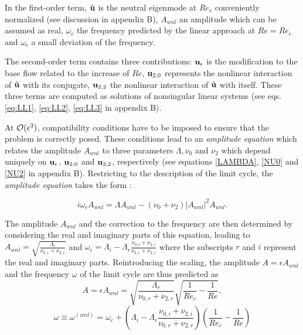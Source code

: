 \documentclass[twocolumn,10pt]{asme2ej}
\newcommand{\be}[1]{ \begin{equation} \label{#1}}
\newcommand{\ee}{\end{equation}}
\begin{document}
In the first-order term, $\hat{\bf u}$ is the neutral eigenmode at $Re_c$ conveniently normalized (see discussion in appendix B), 
$A_{wnl}$ an amplitude which can be assumed as real, $\omega_c$ the frequency predicted by the linear approach at $Re=Re_c$ and $\omega_\epsilon$ a small deviation of the frequency. 

The second-order term contains three contributions: ${\bf u}_{\epsilon}$ is the modification to the base flow related to the 
increase of $Re$, ${\bf u}_{2,0}$  represents the nonlinear interaction of $\hat{\bf u}$ with its conjugate, ${\bf u}_{2,2}$ the nonlinear 
interaction of $\hat{\bf u}$ with itself. These three terms are computed as solutions of nonsingular linear systems 
(see eqs. \ref{eq:LL1}, \ref{eq:LL2}, \ref{eq:LL3} in appendix B).

At ${\cal O}( \epsilon ^3)$, compatibility conditions have to be imposed to ensure that the problem is correctly posed. These conditions lead to an {\em amplitude equation} which relates the amplitude $ A_{wnl}$ to three parameters $\Lambda, \nu_{0}$ and $\nu_{2}$ which depend
uniquely on ${\bf u}_\epsilon$, ${\bf u}_{2,0}$ and ${\bf u}_{2,2}$, respectively (see equations \ref{LAMBDA}, \ref{NU0} and \ref{NU2} in appendix B). Restricting to the description of the limit cycle, the {\em amplitude equation} takes the form :

\be{WNL3}
i \omega_\epsilon A_{wnl} = \Lambda A_{wnl} - (\nu_0+\nu_2)  |A_{wnl}|^2 A_{wnl}.
\ee


The amplitude $A_{wnl}$ and the correction to the frequency are then determined by considering the real and imaginary parts of this equation, leading to
$
A_{wnl}= \sqrt{ \frac{\Lambda_r}{\nu_{0,r}+\nu_{2,r}}}
$ and
$
\omega_\epsilon = \Lambda_i- \Lambda_r \frac{\nu_{0,i}+\nu_{2,i}}{\nu_{0,r}+\nu_{2,r}} 
$
where the subscripts $r$ and $i$ represent the real and imaginary parts.
Reintroducing the scaling, the  amplitude $A =  \epsilon A_{wnl} $ and the frequency $\omega$ of the limit cycle are thus predicted as
\be{ANL} 
A =  \epsilon A_{wnl} =\sqrt{ \frac{\Lambda_r}{\nu_{0,r}+\nu_{2,r} }} \sqrt{\frac{1}{Re_c}-\frac{1}{Re}},
\ee
\be{omegaWNL} 
\omega \equiv \omega^{(wnl)} =\omega_c+ \left( \Lambda_i- \Lambda_r \frac{\nu_{0,i}+\nu_{2,i}}{\nu_{0,r}+\nu_{2,r}} \right) \left(\frac{1}{Re_c}-\frac{1}{Re}\right)
\ee 
\end{document}
